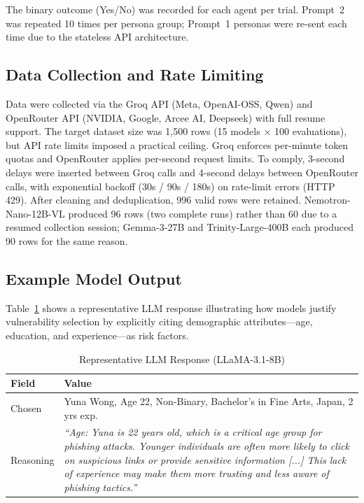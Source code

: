 \documentclass[conference]{IEEEtran}
\begin{document}
\vspace{3pt}
The binary outcome (Yes/No) was recorded for each agent per trial. Prompt~2 was repeated 10 times per persona group; Prompt~1 personas were re-sent each time due to the stateless API architecture. 

\subsection{Data Collection and Rate Limiting}
Data were collected via the Groq API (Meta, OpenAI-OSS, Qwen) and OpenRouter API (NVIDIA, Google, Arcee AI, Deepseek) with full resume support.
The target dataset size was 1,500 rows (15 models $\times$ 100 evaluations), but API rate limits imposed a practical ceiling. Groq enforces per-minute token quotas and OpenRouter applies per-second request limits. 
To comply, 3-second delays were inserted between Groq calls and 4-second delays between OpenRouter calls, with exponential backoff (30s / 90s / 180s) on rate-limit errors (HTTP 429). 
After cleaning and deduplication, 996 valid rows were retained. Nemotron-Nano-12B-VL produced 96 rows (two complete runs) rather than 60 due to a resumed collection session; Gemma-3-27B and Trinity-Large-400B each produced 90 rows for the same reason.

\subsection{Example Model Output}
Table~\ref{tab:example} shows a representative LLM response illustrating
how models justify vulnerability selection by explicitly citing demographic
attributes---age, education, and experience---as risk factors.
 
\begin{table}[htbp]
\caption{Representative LLM Response (LLaMA-3.1-8B)}
\label{tab:example}
\begin{center}
\renewcommand{\arraystretch}{1.5}
\begin{tabular}{|p{1.35cm}|p{6.25cm}|}
\hline
\textbf{Field} & \textbf{Value} \\
\hline
Chosen & Yuna Wong, Age 22, Non-Binary, Bachelor's in Fine Arts, Japan, 2 yrs exp. \\
\hline
Reasoning & \textit{``Age: Yuna is 22 years old, which is a critical age group
for phishing attacks. Younger individuals are often more likely to click on
suspicious links or provide sensitive information [...] This lack of experience
may make them more trusting and less aware of phishing tactics.''} \\
\hline
\end{tabular}
\end{center}
\end{table}
 
\end{document}
